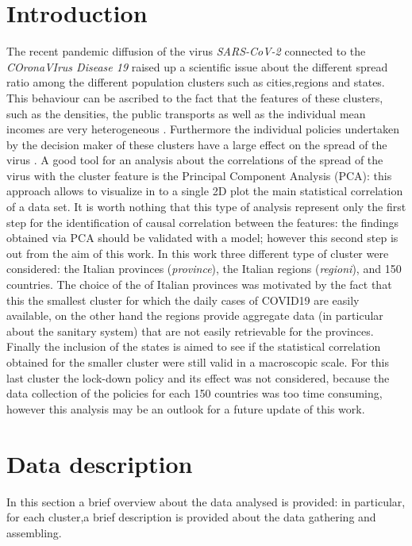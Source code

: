 \documentclass[
12pt, %
a4paper, %
oneside, %
headinclude,footinclude, %
BCOR5mm, %
]{scrartcl}
\begin{document}
\section{Introduction} \label{introduction}
The recent pandemic diffusion of the virus \textit{SARS-CoV-2} connected to the \textit{COronaVIrus Disease 19} raised up a scientific issue about the different spread ratio among the different population clusters such as cities,regions and states. This behaviour can be ascribed to the fact that the features of these clusters, such as the densities, the public transports as well as the individual mean incomes are very heterogeneous \cite{sebhatu2020explaining,skorka2020macroecology}. Furthermore the individual policies undertaken by the decision maker of these clusters have a large effect on the spread of the virus \cite{block2020social}. A good tool for an analysis about the correlations of the spread of the virus with the cluster feature is the Principal Component Analysis (PCA): this approach allows to visualize in to a single 2D plot the main statistical correlation of a data set. It is worth nothing that this type of analysis represent only the first step for the identification of causal correlation between the features: the findings obtained via PCA should be validated with a model; however this second step is out from the aim of this work. In this work three different type of cluster were considered: the Italian provinces (\textit{province}), the Italian regions (\textit{regioni}), and 150 countries. The choice of the of Italian provinces was motivated by the fact that this the smallest cluster for which the daily cases of COVID19 are easily available, on the other hand the regions provide aggregate data (in particular about the sanitary system) that are not easily retrievable for the provinces. Finally the inclusion of the states is aimed to see if the statistical correlation obtained for the smaller cluster were still valid in a macroscopic scale. For this last cluster the lock-down policy and its effect was not considered, because the data collection of the policies for each 150 countries was too time consuming, however this analysis may be an outlook for a future update of this work. 

\section{Data description} \label{Data_description}
In this section a brief overview about the data analysed is provided: in particular, for each cluster,a brief description is provided  about the data gathering and assembling. 
\end{document}
